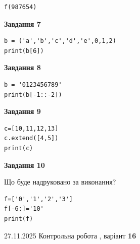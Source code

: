 \documentclass[12pt, ukrainian]{article}
\begin{document}
{{{{{{{{{{{{{{{{\begin{minipage}[t]{10.5cm}
\begin{verbatim}
f(987654)
\end{verbatim}



\begin{center}
\textbf{Завдання 7}
\end{center}

\begin{verbatim}
b = ('a','b','c','d','e',0,1,2)
print(b[6])
\end{verbatim}



\begin{center}
\textbf{Завдання 8}
\end{center}

\begin{verbatim}
b = '0123456789'
print(b[-1::-2])
\end{verbatim}



\begin{center}
\textbf{Завдання 9}
\end{center}

\begin{verbatim}
c=[10,11,12,13]
c.extend([4,5])
print(c)
\end{verbatim}



\begin{center}
\textbf{Завдання 10}
\end{center}
Що буде надруковано за виконання?\par
\begin{verbatim}
f=['0','1','2','3']
f[-6:]='10'
print(f)
\end{verbatim}

\end{minipage}

}
\newpage

{{ 27.11.2025 Контрольна робота , варіант  \No \textbf { 16 }\par}}
{

{%



}}}}}}}}}}}}}}}}}
\end{document}
